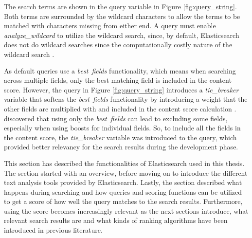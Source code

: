 The search terms are shown in the query variable in Figure \ref{fig:query_string}.
Both terms are surrounded by the wildcard characters to allow the terms to be matched with
characters missing from either end.
A query must enable \emph{analyze\_wildcard} to utilize the wildcard search, since, by default,
Elasticsearch does not do wildcard searches \cite{elasticIntro} since the computationally costly nature
of the wildcard search \cite{relevantSearch}.



As default queries use a \emph{best\ fields} functionality, which means when searching across multiple fields,
only the best matching field is included in the content score.
However, the query in Figure \ref{fig:query_string} introduces a \emph{tie\_breaker} variable 
that softens the \emph{best\ fields} functionality by introducing a weight 
that the other fields are multiplied with and included in the content score calculation 
\cite{relevantSearch}.
\citeauthor{relevantSearch} \cite{relevantSearch} discovered that using only the \emph{best\ fields} can
lead to excluding some fields, especially when using boosts for individual fields.
So, to include all the fields in the content score, the \emph{tie\_breaker} variable was introduced to the query, 
which provided better relevancy for the search results during the development phase.



This section has described the functionalities of Elasticsearch used in this thesis.
The section started with an overview, before moving on to introduce the different text analysis
tools provided by Elasticsearch.
Lastly, the section described what happens during searching and how queries and scoring functions can be
utilized to get a score of how well the query matches to the search results.
Furthermore, using the score becomes increasingly relevant as the next sections introduce,
what relevant search results are and what kinds of ranking algorithms have been introduced in previous literature.



